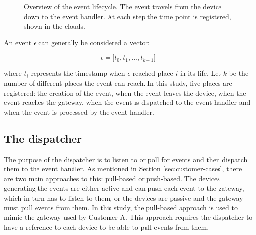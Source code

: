\begin{figure}[h!]
    \centering

    \caption[Over of the event lifecycle.]{Overview of the event lifecycle. The
    event travels from the device down to the event handler. At each step the
    time point is registered, shown in the clouds.}

    \label{fig:event-life}
\end{figure}

An event $\epsilon$ can generally be considered a vector:

$$
\epsilon = \big[ t_0, t_1, ..., t_{k-1} \big]
$$

where $t_i$ represents the timestamp when $\epsilon$ reached place $i$ in its
life. Let $k$ be the number of different places the event can reach. In this
study, five places are registered: the creation of the event, when the event
leaves the device, when the event reaches the gateway, when the event is
dispatched to the event handler and when the event is processed by the event
handler.

\subsection{The dispatcher}

The purpose of the dispatcher is to listen to or poll for events and then
dispatch them to the event handler. As mentioned in Section
\ref{sec:customer-cases}, there are two main approaches to this: pull-based or
push-based. The devices generating the events are either active and can push
each event to the gateway, which in turn has to listen to them, or the devices
are passive and the gateway must pull events from them. In this study, the
pull-based approach is used to mimic the gateway used by Customer A. This
approach requires the dispatcher to have a reference to each device to be able
to pull events from them.


